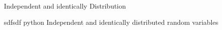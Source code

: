 

Independent and identically Distribution

 sdfsdf
 \gls{python}
Independent and identically distributed random variables


%
%
%












